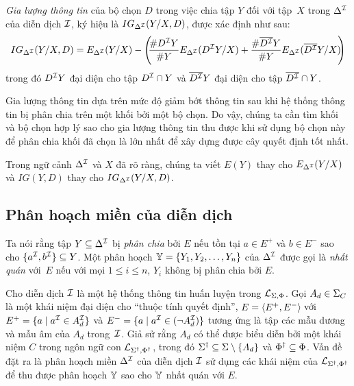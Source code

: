 \begin{Definition}
	{\em Gia lượng thông tin} của bộ chọn $D$ trong việc chia tập $Y$ đối với tập~$X$ trong $\Delta^{\mathcal{I}}$ của diễn dịch $\mathcal{I}$, ký hiệu là $IG_{\Delta^{\mathcal{I}}}(Y/X, D)$, được xác định như sau:
	\begin{equation}
		IG_{\Delta^{\mathcal{I}}}(Y/X, D) = E_{\Delta^{\mathcal{I}}}(Y/X)-
		\left(\!\!\frac{\# D^{\mathcal{I}} Y}{\# Y}E_{\Delta^{\mathcal{I}}}(D^{\mathcal{I}} Y/X)+\frac{\# \overline{D^{\mathcal{I}}}Y}{\# Y}E_{\Delta^{\mathcal{I}}}(\overline{D^{\mathcal{I}}}Y/X)\!\!\right)  \label{eq:InfoGain}
	\end{equation}
	trong đó $D^{\mathcal{I}} Y$ đại diện cho tập $D^{\mathcal{I}} \cap Y$ và $\overline{D^{\mathcal{I}}}Y$ đại diện cho tập $\overline{D^{\mathcal{I}}} \cap Y$.\myend
\end{Definition}

Gia lượng thông tin dựa trên mức độ giảm bớt thông tin sau khi hệ thống thông tin bị phân chia trên một khối bởi một bộ chọn. Do vậy, chúng ta cần tìm khối và bộ chọn hợp lý sao cho gia lượng thông tin thu được khi sử dụng bộ chọn này để phân chia khối đã chọn là lớn nhất để xây dựng được cây quyết định tốt nhất.

Trong ngữ cảnh $\Delta^{\mathcal{I}}$ và $X$ đã rõ ràng, chúng ta viết $E(Y)$ thay cho $E_{\Delta^{\mathcal{I}}}(Y/X)$ và $IG(Y, D)$ thay cho $IG_{\Delta^{\mathcal{I}}}(Y/X, D)$.

\subsection{Phân hoạch miền của diễn dịch}

Ta nói rằng tập $Y \subseteq \Delta^{\mathcal{I}}$ bị {\em phân chia} bởi $E$ nếu tồn tại $a \in E^+$ và $b \in E^-$ sao cho $\{a^{\mathcal{I}}, b^{\mathcal{I}}\} \subseteq Y$. Một phân hoạch $\mathbb{Y} = \{Y_1, Y_2, \ldots, Y_n\}$ của $\Delta^{\mathcal{I}}$ được gọi là {\em nhất quán} với~$E$ nếu với mọi $1 \leq i \leq n$, $Y_i$ không bị phân chia bởi $E$.

Cho diễn dịch $\mathcal{I}$ là một hệ thống thông tin huấn luyện trong $\mathcal{L}_{\Sigma,\Phi}$. Gọi $A_d \in \Sigma_C$ là một khái niệm đại diện cho ``thuộc tính quyết định'', $E = \left\langle E^+, E^-\right\rangle\!$ với $E^+ = \{a \mid a^{\mathcal{I}} \in A_d^{\mathcal{I}}\}$ và $E^- = \{a \mid a^{\mathcal{I}} \in (\neg A_d^{\mathcal{I}})\}$ tương ứng là tập các mẫu dương và mẫu âm của $A_d$ trong~$\mathcal{I}$. Giả sử rằng $A_d$ có thể được biểu diễn bởi một khái niệm $C$ trong ngôn ngữ con $\mathcal{L}_{\Sigma^\dag,\Phi^\dag}$, trong đó $\Sigma^\dag \subseteq \Sigma \setminus \{A_d\}$ và $\Phi^\dag \subseteq \Phi$. Vấn đề đặt ra là phân hoạch miền $\Delta^{\mathcal{I}}$ của diễn dịch $\mathcal{I}$ sử dụng các khái niệm của $\mathcal{L}_{\Sigma^\dag,\Phi^\dag}$ để thu được phân hoạch $\mathbb{Y}$ sao cho $\mathbb{Y}$ nhất quán với $E$.

